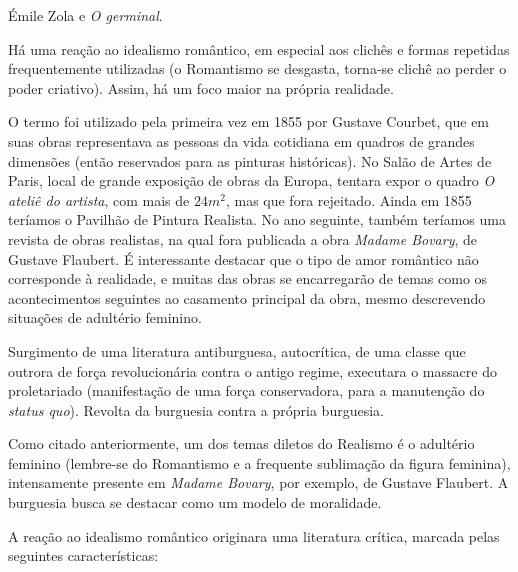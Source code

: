 Émile Zola e \textit{O germinal}.

Há uma reação ao idealismo romântico, em especial aos clichês e formas repetidas frequentemente utilizadas (o Romantismo se desgasta, torna-se clichê ao perder o poder criativo). Assim, há um foco maior na própria realidade.

O termo foi utilizado pela primeira vez em 1855 por Gustave Courbet, que em suas obras representava as pessoas da vida cotidiana em quadros de grandes dimensões (então reservados para as pinturas históricas). No Salão de Artes de Paris, local de grande exposição de obras da Europa, tentara expor o quadro \textit{O ateliê do artista}, com mais de $24 m^2$, mas que fora rejeitado. Ainda em 1855 teríamos o Pavilhão de Pintura Realista. No ano seguinte, também teríamos uma revista de obras realistas, na qual fora publicada a obra \textit{Madame Bovary}, de Gustave Flaubert. É interessante destacar que o tipo de amor romântico não corresponde à realidade, e muitas das obras se encarregarão de temas como os acontecimentos seguintes ao casamento principal da obra, mesmo descrevendo situações de adultério feminino.

Surgimento de uma literatura antiburguesa, autocrítica, de uma classe que outrora de força revolucionária contra o antigo regime, executara o massacre do proletariado (manifestação de uma força conservadora, para a manutenção do \textit{status quo}). Revolta da burguesia contra a própria burguesia.

Como citado anteriormente, um dos temas diletos do Realismo é o adultério feminino (lembre-se do Romantismo e a frequente sublimação da figura feminina), intensamente presente em \textit{Madame Bovary}, por exemplo, de Gustave Flaubert. A burguesia busca se destacar como um modelo de moralidade.

A reação ao idealismo romântico originara uma literatura crítica, marcada pelas seguintes características:

